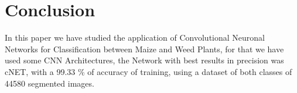 \documentclass[conference]{IEEEtran}
\begin{document}
	
	
	




\section{Conclusion}

In this paper we have studied the application of Convolutional Neuronal Networks for Classification between Maize and Weed Plants, for that we have used some CNN Architectures, the Network with best results in precision was cNET, with a 99.33 \% of accuracy of training, using a dataset of both classes  of 44580 segmented images. \\
\end{document}
